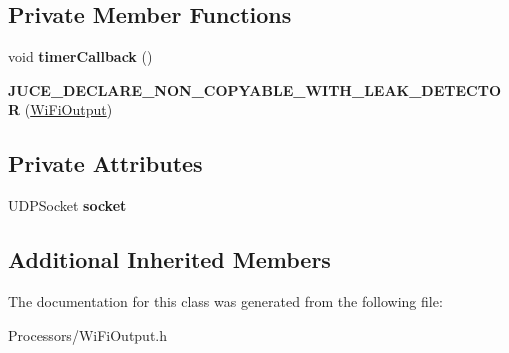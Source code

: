 \subsection*{Private Member Functions}
\begin{DoxyCompactItemize}
\item 
\hypertarget{classWiFiOutput_ae1671b27d09fd50c11a0ec4344cdac60}{void {\bfseries timer\-Callback} ()}\label{classWiFiOutput_ae1671b27d09fd50c11a0ec4344cdac60}

\item 
\hypertarget{classWiFiOutput_ad1bad0b4dcf558ffb77084511fb129a0}{{\bfseries J\-U\-C\-E\-\_\-\-D\-E\-C\-L\-A\-R\-E\-\_\-\-N\-O\-N\-\_\-\-C\-O\-P\-Y\-A\-B\-L\-E\-\_\-\-W\-I\-T\-H\-\_\-\-L\-E\-A\-K\-\_\-\-D\-E\-T\-E\-C\-T\-O\-R} (\hyperlink{classWiFiOutput}{Wi\-Fi\-Output})}\label{classWiFiOutput_ad1bad0b4dcf558ffb77084511fb129a0}

\end{DoxyCompactItemize}
\subsection*{Private Attributes}
\begin{DoxyCompactItemize}
\item 
\hypertarget{classWiFiOutput_a75aff53ec84be5597be3c3994d68bba6}{U\-D\-P\-Socket {\bfseries socket}}\label{classWiFiOutput_a75aff53ec84be5597be3c3994d68bba6}

\end{DoxyCompactItemize}
\subsection*{Additional Inherited Members}


The documentation for this class was generated from the following file\-:\begin{DoxyCompactItemize}
\item 
Processors/Wi\-Fi\-Output.\-h\end{DoxyCompactItemize}
